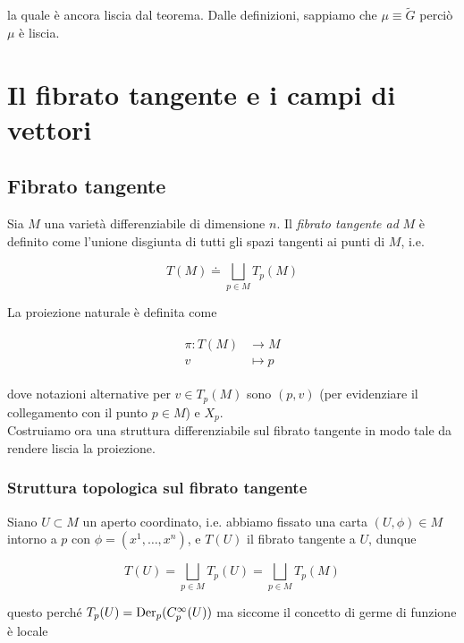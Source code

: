 la quale è ancora liscia dal teorema. Dalle definizioni, sappiamo che $ \mu \equiv \tilde{G} $ perciò $ \mu $ è liscia.

\section{Il fibrato tangente e i campi di vettori}

\subsection{Fibrato tangente}

Sia $ M $ una varietà differenziabile di dimensione $ n $. Il \textit{fibrato tangente ad} $ M $ è definito come l'unione disgiunta di tutti gli spazi tangenti ai punti di $ M $, i.e.

\begin{equation}
	T(M) \doteq \bigsqcup_{p \in M} T_{p}(M)
\end{equation}

La proiezione naturale è definita come

\begin{align}
	\begin{split}
		\pi : T(M) &\to M\\
		v &\mapsto p
	\end{split}
\end{align}

dove notazioni alternative per $ v \in T_{p}(M) $ sono $ (p,v) $ (per evidenziare il collegamento con il punto $ p \in M $) e $ X_{p} $.\\
Costruiamo ora una struttura differenziabile sul fibrato tangente in modo tale da rendere liscia la proiezione.

\subsubsection{Struttura topologica sul fibrato tangente}

Siano $ U \subset M $ un aperto coordinato, i.e. abbiamo fissato una carta $ (U,\phi) \in M $ intorno a $ p $ con $ \phi = (x^{1},\dots,x^{n}) $, e $ T(U) $ il fibrato tangente a $ U $, dunque

\begin{equation}
	T(U) = \bigsqcup_{p \in M} T_{p}(U) = \bigsqcup_{p \in M} T_{p}(M)
\end{equation}

questo perché $ T_{p}(U) = \operatorname{Der}_{p}(C_{p}^{\infty}(U)) $ ma siccome il concetto di germe di funzione è locale

